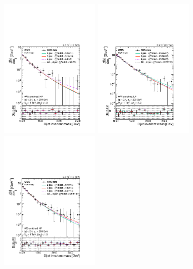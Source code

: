 \begin{figure}[h!]
\centering
\includegraphics[width=0.43\textwidth]{figures/analysis/search1/AN-15-211/ftest/no5par/WWHP_fitComp.pdf}
\includegraphics[width=0.43\textwidth]{figures/analysis/search1/AN-15-211/ftest/no5par/WWLP_fitComp.pdf}\\
\includegraphics[width=0.43\textwidth]{figures/analysis/search1/AN-15-211/ftest/no5par/WZHP_fitComp.pdf}

\end{figure}
